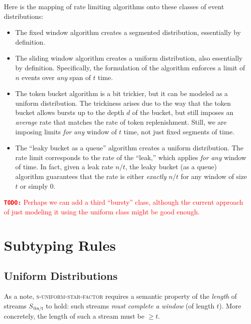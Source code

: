 \documentclass[acmsmall,nonacm,screen]{acmart}
\makeatletter
\newcommand{\rr}[3] {
  {#1}_{\mathsf{@{#2}/{#3}}}
}
\newcommand{\subtype}{\mathrel{<:}}
\newcommand{\todo}[1]{\textcolor{red}{\textbf{\texttt{TODO:}} {#1}}}
\makeatother
\begin{document}
Here is the mapping of rate limiting algorithms onto these classes of event distributions:
\begin{itemize}
  \item The fixed window algorithm creates a segmented distribution, essentially by definition.
  \item The sliding window algorithm creates a uniform distribution, also essentially by definition. Specifically, the formulation of the algorithm enforces a limit of $n$ events over \textit{any} span of $t$ time.
  \item The token bucket algorithm is a bit trickier, but it can be modeled as a uniform distribution. The trickiness arises due to the way that the token bucket allows bursts up to the depth $d$ of the bucket, but still imposes an \textit{average} rate that matches the rate of token replenishment. Still, we are imposing limits \textit{for any} window of $t$ time, not just fixed segments of time.
  \item The ``leaky bucket as a queue'' algorithm creates a uniform distribution. The rate limit corresponds to the rate of the ``leak,'' which applies \textit{for any} window of time. In fact, given a leak rate $n/t$, the leaky bucket (as a queue) algorithm guarantees that the rate is either \textit{exactly} $n/t$ for any window of size $t$ or simply $0$.
\end{itemize}

\todo{Perhaps we can add a third ``bursty'' class, although the current approach of just modeling it using the uniform class might be good enough.}

\section{Subtyping Rules}
\subsection{Uniform Distributions}
As a note, \textsc{s-uniform-star-factor} requires a semantic property of the \textit{length} of streams $\rr{S}{n}{t}$ to hold: such streams \textit{must complete a window} (of length $t$). More concretely, the length of such a stream must be $\geq t$.
\end{document}
